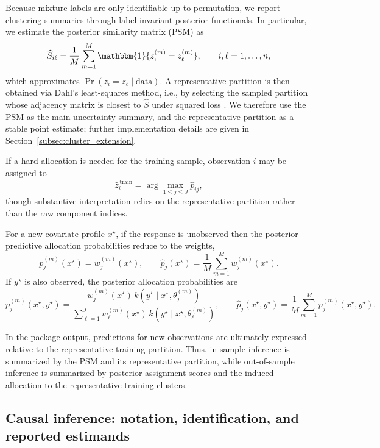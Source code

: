 \documentclass[11pt]{article}\usepackage[]{graphicx}\usepackage[]{xcolor}
\begin{document}
Because mixture labels are only identifiable up to permutation, we report clustering
summaries through label-invariant posterior functionals. In particular, we estimate
the posterior similarity matrix (PSM) as
\begin{equation*}
\widehat S_{i\ell}
=
\frac{1}{M}\sum_{m=1}^M
\mathbbm{1}\{z_i^{(m)}=z_\ell^{(m)}\},
\qquad i,\ell=1,\dots,n,
\end{equation*}
which approximates \(\Pr(z_i=z_\ell \mid \text{data})\). A representative partition is
then obtained via Dahl's least-squares method, i.e., by selecting the sampled partition
whose adjacency matrix is closest to \(\widehat S\) under squared loss
\citep{Dahl2006}. We therefore use the PSM as the main uncertainty summary, and the
representative partition as a stable point estimate; further implementation details are
given in Section~\ref{subsec:cluster_extension}.

If a hard allocation is needed for the training sample, observation \(i\) may be
assigned to
\[
\widehat z_i^{\,\mathrm{train}}
=
\arg\max_{1\le j\le J}\widehat p_{ij},
\]
though substantive interpretation relies on the representative partition rather than
the raw component indices.

For a new covariate profile \(x^\star\), if the response is unobserved then the
posterior predictive allocation probabilities reduce to the weights,
\[
p_j^{(m)}(x^\star)=w_j^{(m)}(x^\star),
\qquad
\widehat p_j(x^\star)=\frac{1}{M}\sum_{m=1}^M w_j^{(m)}(x^\star).
\]
If \(y^\star\) is also observed, the posterior allocation probabilities are
\[
p_j^{(m)}(x^\star,y^\star)
=
\frac{
w_j^{(m)}(x^\star)\,k(y^\star \mid x^\star,\theta_j^{(m)})
}{
\sum_{\ell=1}^J
w_\ell^{(m)}(x^\star)\,k(y^\star \mid x^\star,\theta_\ell^{(m)})
},
\qquad
\widehat p_j(x^\star,y^\star)
=
\frac{1}{M}\sum_{m=1}^M p_j^{(m)}(x^\star,y^\star).
\]

In the package output, predictions for new observations are ultimately expressed
relative to the representative training partition. Thus, in-sample inference is
summarized by the PSM and its representative partition, while out-of-sample inference
is summarized by posterior assignment scores and the induced allocation to the
representative training clusters.

\subsection{Causal inference: notation, identification, and reported estimands}
\label{subsec:causal}
\end{document}

